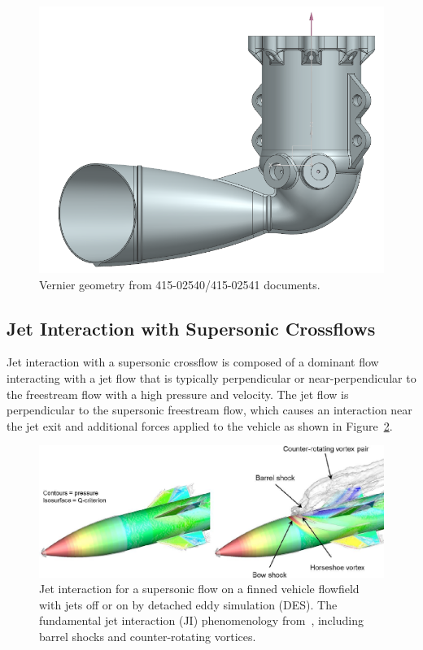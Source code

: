 \documentclass[12pt]{article}
\begin{document}
\begin{figure}[H]
    \includegraphics[width=0.495\linewidth]{figs/v3.png}
    \caption{Vernier geometry from 415-02540/415-02541 documents.}
    \label{fig:vernier-geo}
\end{figure}

\subsection{Jet Interaction with Supersonic Crossflows}
Jet interaction with a supersonic crossflow is composed of a dominant flow interacting
with a jet flow that is typically perpendicular or near-perpendicular to the freestream
flow with a high pressure and velocity. The jet flow is perpendicular to the supersonic freestream
flow, which causes an interaction near the jet exit and additional forces applied to the
vehicle as shown in Figure~\ref{fig:1vanderWyst}.

\begin{figure}[H]
    \centering
    \includegraphics[width=\linewidth]{figs/fig1vanderWyst.png}
    \caption{Jet interaction for a supersonic flow on a finned vehicle flowfield with jets off or on by detached eddy simulation (DES). The fundamental jet interaction (JI) phenomenology from~\cite{vanderwyst2016computationally}, including barrel shocks and counter-rotating vortices.}
    \label{fig:1vanderWyst}
\end{figure}
\end{document}
